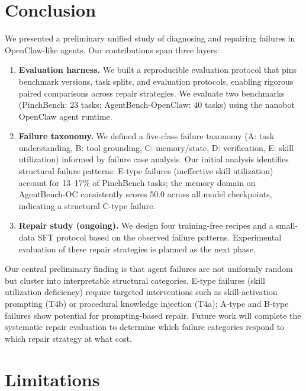 \section{Conclusion}
\label{sec:conclusion}
We presented a preliminary unified study of diagnosing and repairing failures in OpenClaw-like agents. Our contributions span three layers:

\begin{enumerate}[leftmargin=2em, itemsep=1pt]

  \item \textbf{Evaluation harness.} We built a reproducible evaluation protocol that pins benchmark versions, task splits, and evaluation protocols, enabling rigorous paired comparisons across repair strategies. We evaluate two benchmarks (PinchBench: 23 tasks; AgentBench-OpenClaw: 40 tasks) using the nanobot OpenClaw agent runtime.

  \item \textbf{Failure taxonomy.} We defined a five-class failure taxonomy (A: task understanding, B: tool grounding, C: memory/state, D: verification, E: skill utilization) informed by failure case analysis. Our initial analysis identifies structural failure patterns: E-type failures (ineffective skill utilization) account for 13--17\% of PinchBench tasks; the memory domain on AgentBench-OC consistently scores 50.0 across all model checkpoints, indicating a structural C-type failure.

  \item \textbf{Repair study (ongoing).} We design four training-free recipes and a small-data SFT protocol based on the observed failure patterns. Experimental evaluation of these repair strategies is planned as the next phase.

\end{enumerate}

Our central preliminary finding is that agent failures are not uniformly random but cluster into interpretable structural categories. E-type failures (skill utilization deficiency) require targeted interventions such as skill-activation prompting (T4b) or procedural knowledge injection (T4a); A-type and B-type failures show potential for prompting-based repair. Future work will complete the systematic repair evaluation to determine which failure categories respond to which repair strategy at what cost.

\section{Limitations}
\label{sec:limitations}

